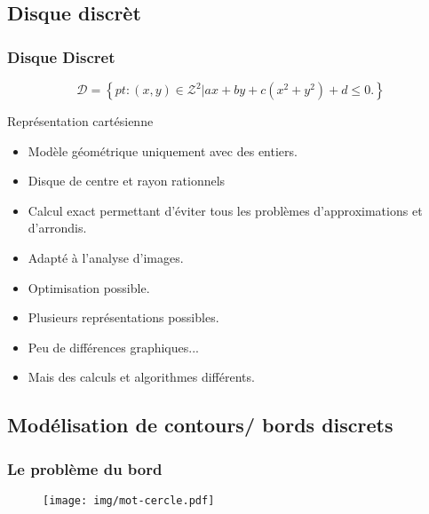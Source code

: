 \documentclass{beamer}
\begin{document}
\subsection{Disque discrèt}
\begin{frame}
  \frametitle{Disque Discret}
  \begin{block}{}
    $$\mathcal{D} =  \left\{ pt : (x,y) \in \mathcal{Z}^{2} |  ax + by + c(x^2 + y^2) + d \leq 0. \right\}$$
  \end{block}

  \begin{block}{Représentation cartésienne}
    \begin{itemize}
      \item Modèle géométrique uniquement avec des entiers.
      \item Disque de centre et rayon rationnels
    \end{itemize}
  \end{block}
  \begin{exampleblock}{}
    \begin{itemize}
      \item Calcul exact permettant d'éviter tous les problèmes d'approximations et d'arrondis.
      \item Adapté à l'analyse d'images.
      \item Optimisation possible.
    \end{itemize}
  \end{exampleblock}

  \begin{exampleblock}{}
    \begin{itemize}
      \item Plusieurs représentations possibles.
      \item Peu de différences graphiques...
      \item Mais des calculs et algorithmes différents.
    \end{itemize}
  \end{exampleblock}

\end{frame}

\subsection{Modélisation de contours/ bords discrets}
\begin{frame}
\frametitle{Le problème du bord}

      \begin{figure}[h!]
      \centering
        \texttt{[image: img/mot-cercle.pdf]}
      \end{figure}

\end{frame}
\end{document}
